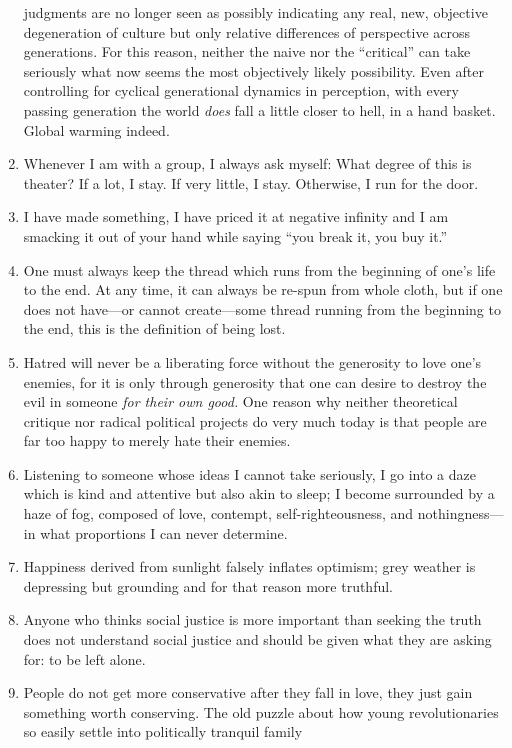 \documentclass[a4paper,12pt,margin=.5in]{article}
\begin{document}
\begin{enumerate}
  judgments are no longer seen as possibly indicating any real, new,
  objective degeneration of culture but only relative differences of
  perspective across generations. For this reason, neither the naive nor
  the ``critical'' can take seriously what now seems the most
  objectively likely possibility. Even after controlling for cyclical
  generational dynamics in perception, with every passing generation the
  world \emph{does} fall a little closer to hell, in a hand basket.
  Global warming indeed.
\item
  Whenever I am with a group, I always ask myself: What degree of this
  is theater? If a lot, I stay. If very little, I stay. Otherwise, I run
  for the door.
\item
  I have made something, I have priced it at negative infinity and I am
  smacking it out of your hand while saying ``you break it, you buy
  it.''
\item
  One must always keep the thread which runs from the beginning of one's
  life to the end. At any time, it can always be re-spun from whole
  cloth, but if one does not have---or cannot create---some thread
  running from the beginning to the end, this is the definition of being
  lost.
\item
  Hatred will never be a liberating force without the generosity to love
  one's enemies, for it is only through generosity that one can desire
  to destroy the evil in someone \emph{for their own good.} One reason
  why neither theoretical critique nor radical political projects do
  very much today is that people are far too happy to merely hate their
  enemies.
\item
  Listening to someone whose ideas I cannot take seriously, I go into a
  daze which is kind and attentive but also akin to sleep; I become
  surrounded by a haze of fog, composed of love, contempt,
  self-righteousness, and nothingness---in what proportions I can never
  determine.
\item
  Happiness derived from sunlight falsely inflates optimism; grey
  weather is depressing but grounding and for that reason more truthful.
\item
  Anyone who thinks social justice is more important than seeking the
  truth does not understand social justice and should be given what they
  are asking for: to be left alone.
\item
  People do not get more conservative after they fall in love, they just
  gain something worth conserving. The old puzzle about how young
  revolutionaries so easily settle into politically tranquil family

\end{enumerate}
\end{document}

